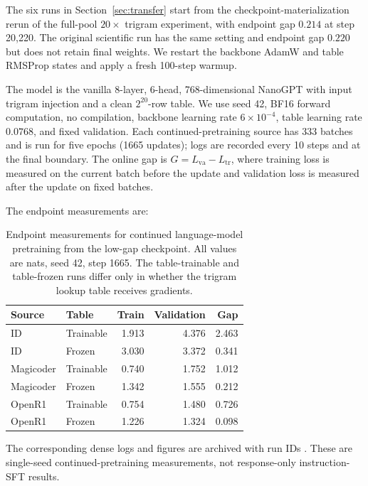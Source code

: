 The six runs in Section~\ref{sec:transfer} start from the checkpoint-materialization rerun of the full-pool $20\times$ trigram experiment, with endpoint gap $0.214$ at step 20,220. The original scientific run has the same setting and endpoint gap $0.220$ but does not retain final weights. We restart the backbone AdamW and table RMSProp states and apply a fresh 100-step warmup.

The model is the vanilla 8-layer, 6-head, 768-dimensional NanoGPT with input trigram injection and a clean $2^{20}$-row table. We use seed 42, BF16 forward computation, no compilation, backbone learning rate $6\times10^{-4}$, table learning rate $0.0768$, and fixed validation. Each continued-pretraining source has 333 batches and is run for five epochs (1665 updates); logs are recorded every 10 steps and at the final boundary. The online gap is $G=L_{\mathrm{va}}-L_{\mathrm{tr}}$, where training loss is measured on the current batch before the update and validation loss is measured after the update on fixed batches.

The endpoint measurements are:

\begin{table}[!htbp]
\centering\small
\caption{Endpoint measurements for continued language-model pretraining from the low-gap checkpoint. All values are nats, seed 42, step 1665. The table-trainable and table-frozen runs differ only in whether the trigram lookup table receives gradients.}
\label{tab:sft-results}
\begin{tabular}{llrrr}
\toprule
Source & Table & Train & Validation & Gap\\
\midrule
ID & Trainable & 1.913 & 4.376 & 2.463\\
ID & Frozen & 3.030 & 3.372 & 0.341\\
Magicoder & Trainable & 0.740 & 1.752 & 1.012\\
Magicoder & Frozen & 1.342 & 1.555 & 0.212\\
OpenR1 & Trainable & 0.754 & 1.480 & 0.726\\
OpenR1 & Frozen & 1.226 & 1.324 & 0.098\\
\bottomrule
\end{tabular}
\end{table}

The corresponding dense logs and figures are archived with run IDs . These are single-seed continued-pretraining measurements, not response-only instruction-SFT results.

